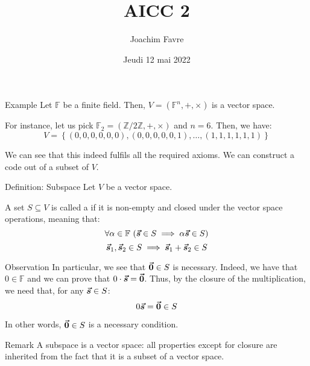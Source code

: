 \documentclass[a4paper]{article}
\title{AICC 2}
\author{Joachim Favre}
\date{Jeudi 12 mai 2022}
\begin{document}
\maketitle


\begin{parag}{Example}
    Let $\mathbb{F}$ be a finite field. Then, $V = \left(\mathbb{F}^n, +, \times\right)$ is a vector space.
    
    For instance, let us pick $\mathbb{F}_2 = \left(\mathbb{Z} / 2\mathbb{Z}, +, \times\right)$ and $n = 6$. Then, we have: 
    \[V = \left\{\left(0, 0, 0, 0, 0, 0\right), \left(0, 0, 0, 0, 0, 1\right), \ldots, \left(1, 1, 1, 1, 1, 1\right)\right\}\]
    
    We can see that this indeed fulfils all the required axioms. We can construct a code out of a subset of $V$.
\end{parag}

\begin{parag}{Definition: Subspace}
    Let $V$ be a vector space. 

    A set $S \subseteq V$ is called a  if it is non-empty and closed under the vector space operations, meaning that:  
    \[\forall \alpha \in \mathbb{F}\ \left(\bvec{s} \in S \implies \alpha \bvec{s} \in S\right)\]
    \[\bm{\protect\vec{s}}_1, \bm{\protect\vec{s}}_2 \in S \implies \bm{\protect\vec{s}}_1 + \bm{\protect\vec{s}}_2 \in S\]

    \begin{subparag}{Observation}
        In particular, we see that $\bm{\protect\vec{0}} \in S$ is necessary. Indeed, we have that $0 \in \mathbb{F}$ and we can prove that $0 \cdot \bm{\protect\vec{s}} = \bm{\protect\vec{0}}$. Thus, by the closure of the multiplication, we need that, for any $\bm{\protect\vec{s}} \in S$: 
        \[0 \bm{\protect\vec{s}} = \bm{\protect\vec{0}} \in S\]
        
        In other words, $\bm{\protect\vec{0}} \in S$ is a necessary condition.
    \end{subparag}
    
    \begin{subparag}{Remark}
        A subspace is a vector space: all properties except for closure are inherited from the fact that it is a subset of a vector space.
    \end{subparag}
\end{parag}
\end{document}
